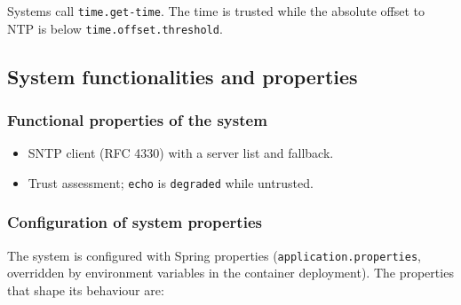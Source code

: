 \documentclass[a4paper]{arrowhead}
\begin{document}
Systems call \texttt{time.\allowbreak{}get-\allowbreak{}time}. The time is trusted while the absolute offset to NTP is below \texttt{time.\allowbreak{}offset.\allowbreak{}threshold}.

\subsection{System functionalities and properties}
\label{sec:properties}

\subsubsection{Functional properties of the system}

\begin{itemize}
  \item SNTP client (RFC 4330) with a server list and fallback.
  \item Trust assessment; \texttt{echo} is \texttt{degraded} while untrusted.
\end{itemize}

\subsubsection{Configuration of system properties}

The system is configured with Spring properties (\texttt{application.properties}, overridden by environment variables in the container deployment). The properties that shape its behaviour are:
\end{document}
